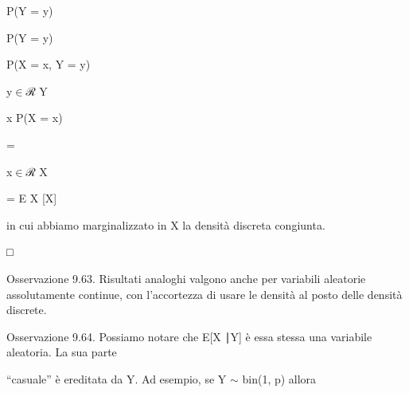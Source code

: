 \documentclass[a4paper,portrait,12pt]{article}
\begin{document}
\begin{flushleft}
P(Y = y)
\end{flushleft}


\begin{flushleft}
P(Y = y)
\end{flushleft}





\begin{flushleft}
P(X = x, Y = y)
\end{flushleft}


\begin{flushleft}
y$\in$ℛ Y
\end{flushleft}





\begin{flushleft}
x P(X = x)
\end{flushleft}





=


\begin{flushleft}
x$\in$ℛ X
\end{flushleft}





\begin{flushleft}
= E X [X]
\end{flushleft}


\begin{flushleft}
in cui abbiamo marginalizzato in X la densit\`{a} discreta congiunta.
\end{flushleft}





□





\begin{flushleft}
Osservazione 9.63. Risultati analoghi valgono anche per variabili aleatorie assolutamente continue, con l'accortezza di usare le densit\`{a} al posto delle densit\`{a} discrete.
\end{flushleft}


\begin{flushleft}
Osservazione 9.64. Possiamo notare che E[X ∣Y] \`{e} essa stessa una variabile aleatoria. La sua parte
\end{flushleft}


\begin{flushleft}
{``}casuale'' \`{e} ereditata da Y. Ad esempio, se Y $\sim$ bin(1, p) allora
\end{flushleft}
\end{document}
